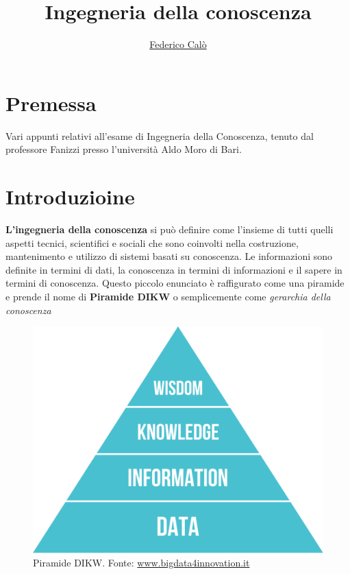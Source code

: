 \documentclass[a4paper]{extarticle}
\title{Ingegneria della conoscenza}
\author{\href{http://www.federicocalo.it}{Federico Calò} }
\date{}
\begin{document}
\maketitle
\newpage
\tableofcontents
\voffset -30pt

\newpage

\section*{Premessa}
Vari appunti relativi all'esame di Ingegneria della Conoscenza, tenuto dal professore Fanizzi presso l'università Aldo Moro di Bari.

\newpage

\section{Introduzioine}

\textbf{L'ingegneria della conoscenza} si può definire come l'insieme di tutti quelli aspetti tecnici, scientifici e sociali che sono coinvolti nella costruzione, mantenimento e utilizzo di sistemi basati su conoscenza. Le informazioni sono definite in termini di dati, la conoscenza in termini di informazioni e il sapere in termini di conoscenza. Questo piccolo enunciato è raffigurato come una piramide e prende il nome di \textbf{Piramide DIKW} o semplicemente come \textit{gerarchia della conoscenza}
\linebreak
\begin{figure}[h]
\centering
\includegraphics[scale=0.3]{PiramideDIKW}
\caption{Piramide DIKW. Fonte: \href{https://www.bigdata4innovation.it/big-data/la-piramide-dikw-cose-e-cosa-rappresenta/}{www.bigdata4innovation.it}}
\end{figure}
\end{document}
